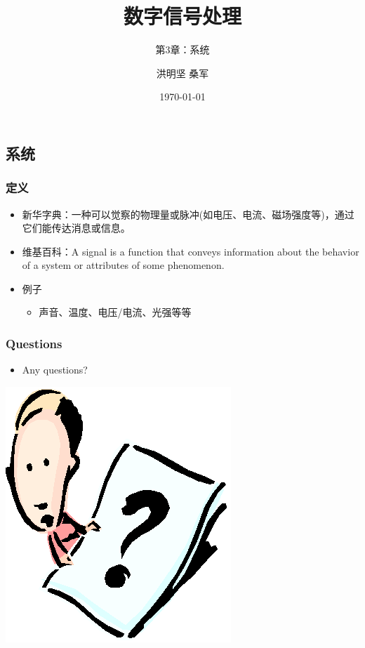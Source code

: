 \documentclass[CJKutf8,xcolor=pdftex,dvipsnames,table]{beamer}
\begin{document}
\begin{CJK*}{UTF8}{song}

  \title{ 数字信号处理}
  \subtitle{ 第3章：系统}
  \author{ 洪明坚 \hspace{1mm} 桑军}
  \date{\today}


  \frame{\titlepage}
  
  \section{系统}
  
  \begin{frame}
    \frametitle{定义}
    \begin{itemize}
    \item 新华字典：一种可以觉察的物理量或脉冲(如电压、电流、磁场强度等)，通过它们能传达消息或信息。
    \item 维基百科：A signal is a function that conveys information about the behavior of a system or attributes of some phenomenon.
    \item 例子
        \begin{itemize}
        \item 声音、温度、电压/电流、光强等等
        \end{itemize}    
    \end{itemize}
  \end{frame}
    
  \begin{frame}
    \frametitle{Questions}
    \begin{itemize}
    \item Any questions?
    \end{itemize}
    \begin{center}
      \includegraphics[scale=.5]{question}
    \end{center}
  \end{frame}    
    
\end{CJK*}
\end{document}
